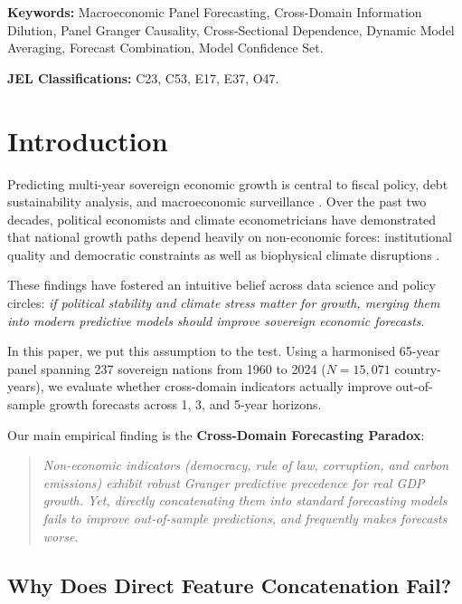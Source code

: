 \documentclass[11pt,a4paper]{article}
\begin{document}
\vspace{0.5em}
\noindent \textbf{Keywords:} Macroeconomic Panel Forecasting, Cross-Domain Information Dilution, Panel Granger Causality, Cross-Sectional Dependence, Dynamic Model Averaging, Forecast Combination, Model Confidence Set.

\vspace{0.5em}
\noindent \textbf{JEL Classifications:} C23, C53, E17, E37, O47.

\newpage

\section{Introduction}
\label{sec:intro}

Predicting multi-year sovereign economic growth is central to fiscal policy, debt sustainability analysis, and macroeconomic surveillance \citep{stock2006, timmermann2006}. Over the past two decades, political economists and climate econometricians have demonstrated that national growth paths depend heavily on non-economic forces: institutional quality and democratic constraints \citep{acemoglu2001, acemoglu2005, knack1997} as well as biophysical climate disruptions \citep{burke2015, dell2014}. 

These findings have fostered an intuitive belief across data science and policy circles: \textit{if political stability and climate stress matter for growth, merging them into modern predictive models should improve sovereign economic forecasts}.

In this paper, we put this assumption to the test. Using a harmonised 65-year panel spanning 237 sovereign nations from 1960 to 2024 ($N = 15{,}071$ country-years), we evaluate whether cross-domain indicators actually improve out-of-sample growth forecasts across 1, 3, and 5-year horizons. 

Our main empirical finding is the \textbf{Cross-Domain Forecasting Paradox}:
\begin{quote}
\textit{Non-economic indicators (democracy, rule of law, corruption, and carbon emissions) exhibit robust Granger predictive precedence for real GDP growth. Yet, directly concatenating them into standard forecasting models fails to improve out-of-sample predictions, and frequently makes forecasts worse.}
\end{quote}

\subsection{Why Does Direct Feature Concatenation Fail?}
\end{document}
